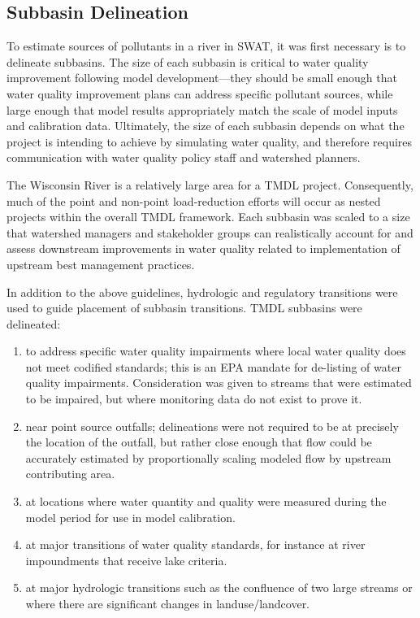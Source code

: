
\subsection{Subbasin Delineation}\label{sec:sub_delineation}
To estimate sources of pollutants in a river in SWAT, it was first necessary is to delineate subbasins. The size of each subbasin is critical to water quality improvement following model development---they should be small enough that water quality improvement plans can address specific pollutant sources, while large enough that model results appropriately match the scale of model inputs and calibration data. Ultimately, the size of each subbasin depends on what the project is intending to achieve by simulating water quality, and therefore requires communication with water quality policy staff and watershed planners.


The Wisconsin River is a relatively large area for a TMDL project. Consequently, much of the point and non-point load-reduction efforts will occur as nested projects within the overall TMDL framework. Each subbasin was scaled to a size that watershed managers and stakeholder groups can realistically account for and assess downstream improvements in water quality related to implementation of upstream best management practices.

In addition to the above guidelines, hydrologic and regulatory transitions were used to guide placement of subbasin transitions. TMDL subbasins were delineated: 
\begin{enumerate}
	\item to address specific water quality impairments where local water quality does not meet codified standards; this is an EPA mandate for de-listing of water quality impairments. Consideration was given to streams that were estimated to be impaired, but where monitoring data do not exist to prove it.
	\item near point source outfalls; delineations were not required to be at precisely the location of the outfall, but rather close enough that flow could be accurately estimated by proportionally scaling modeled flow by upstream contributing area.
	\item at locations where water quantity and quality were measured during the model period for use in model calibration.
	\item at major transitions of water quality standards, for instance at river impoundments that receive lake criteria.
	\item at major hydrologic transitions such as the confluence of two large streams or where there are significant changes in landuse/landcover.
\end{enumerate}

